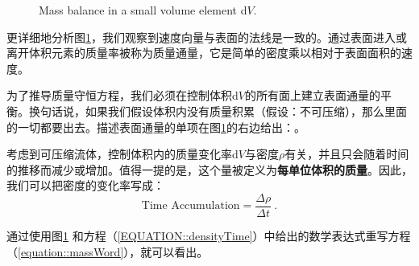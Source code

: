 \documentclass[LBMDerivation.tex]{subfiles}
\begin{document}
\begin{figure}[!b]
\caption{Mass balance in a small volume element d$V$.}
\label{figure::massFigure}
\end{figure}
%
%
%
%
	更详细地分析图\ref{figure::massFigure}，我们观察到速度向量与表面的法线是一致的。通过表面进入或离开体积元素的质量率被称为质量通量，它是简单的密度乘以相对于表面面积的速度。


	为了推导质量守恒方程，我们必须在控制体积d$V$的所有面上建立表面通量的平衡。换句话说，如果我们假设体积内没有质量积累（假设：不可压缩），那么里面的一切都要出去。描述表面通量的单项在图\ref{figure::massFigure}的右边给出：。

 考虑到可压缩流体，控制体积内的质量变化率d$V$与密度$\rho$有关，并且只会随着时间的推移而减少或增加。值得一提的是，这个量被定义为\textbf{每单位体积的质量}。因此，我们可以把密度的变化率写成：
%
%
\begin{equation}
 \text{Time Accumulation} = \frac{\Delta \rho}{\Delta t}~.
 \label{EQUATION::densityTime}
\end{equation}
%
%

	通过使用图\ref{figure::massFigure} 和方程（\ref{EQUATION::densityTime}）中给出的数学表达式重写方程（\ref{equation::massWord}），就可以看出。
\end{document}
